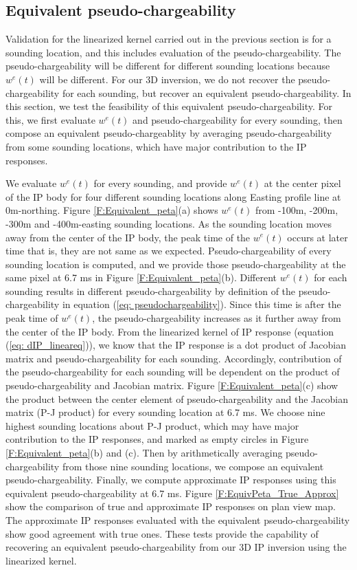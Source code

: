 \documentclass[a4paper, 11pt]{article}
\begin{document}
\subsection{Equivalent pseudo-chargeability}
Validation for the linearized kernel carried out in the previous section is for a sounding location, and this includes evaluation of the pseudo-chargeability. 
The pseudo-chargeability will be different for different sounding locations because $w^e(t)$ will be different. 
For our 3D inversion, we do not recover the pseudo-chargeability for each sounding, but 
recover an equivalent pseudo-chargeability. 
In this section, we test the feasibility of this equivalent pseudo-chargeability. 
For this, we first evaluate $w^e(t)$ and pseudo-chargeability for every sounding, then compose an equivalent pseudo-chargeablity by averaging pseudo-chargeability from some sounding locations, which have major contribution to the IP responses. 

We evaluate $w^e(t)$ for every sounding, and provide $w^e(t)$ at the center pixel of the IP body for four different sounding locations along Easting profile line at 0m-northing. 
Figure \ref{F:Equivalent_peta}(a) shows $w^e(t)$ from -100m, -200m, -300m and -400m-easting sounding locations. 
As the sounding location moves away from the center of the IP body, the peak time of the $w^e(t)$ occurs at later time that is, they are not same as we expected. 
Pseudo-chargeability of every sounding location is computed, and we provide those pseudo-chargeability at the same pixel at 6.7 ms in Figure \ref{F:Equivalent_peta}(b). 
Different $w^e(t)$ for each sounding results in different pseudo-chargeability by definition of the pseudo-chargeability in equation (\ref{eq: pseudochargeability}). 
Since this time is after the peak time of $w^e(t)$, the pseudo-chargeability increases as it further away from the center of the IP body. 
From the linearized kernel of IP response (equation (\ref{eq: dIP_lineareq})), we know that the IP response is a dot product of Jacobian matrix and pseudo-chargeability for each sounding. 
Accordingly, contribution of the pseudo-chargeability for each sounding will be dependent on the product of pseudo-chargeability and Jacobian matrix. 
Figure \ref{F:Equivalent_peta}(c) show the product between the center element of pseudo-chargeability and the Jacobian matrix (P-J product) for every sounding location at 6.7 ms. 
We choose nine highest sounding locations about P-J product, which may have major contribution to the IP responses, and marked as empty circles in Figure \ref{F:Equivalent_peta}(b) and (c).
Then by arithmetically averaging pseudo-chargeability from those nine sounding locations, we compose an equivalent pseudo-chargeability. 
Finally, we compute approximate IP responses using this equivalent pseudo-chargeability at 6.7 ms. 
Figure \ref{F:EquivPeta_True_Approx} show the comparison of true and approximate IP responses on plan view map. 
The approximate IP responses evaluated with the equivalent pseudo-chargeability show good agreement with true ones.
These tests provide the capability of recovering an equivalent pseudo-chargeability from our 3D IP inversion using the linearized kernel. 
\end{document}
